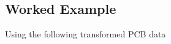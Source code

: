 \hypertarget{worked-example}{%
\subsection{Worked Example}\label{worked-example}}

Using the following transformed PCB data

